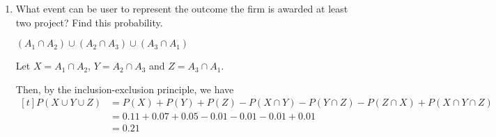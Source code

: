 \begin{example}[MMSA ex. 15]
\begin{enumerate}[label=\alph*)]
        \item What event can be user to represent the outcome the firm is awarded at least two project? Find this probability. 

        $(A_1 \cap A_2) \cup (A_2 \cap A_3) \cup (A_3 \cap A_1)$

        Let $X = A_1 \cap A_2$, $Y = A_2 \cap A_3$ and $Z = A_3 \cap A_1$. 
        
        Then, by the inclusion-exclusion principle, we have $$\begin{aligned}[t]
            P(X \cup Y \cup Z) & = P(X) + P(Y) + P(Z) - P(X \cap Y) - P(Y \cap Z) - P(Z \cap X) + P(X \cap Y \cap Z) \\
                               & = 0.11 + 0.07 + 0.05 - 0.01 - 0.01 - 0.01 + 0.01                                    \\
                               & = 0.21
        \end{aligned}$$
    \end{enumerate}
\end{example}